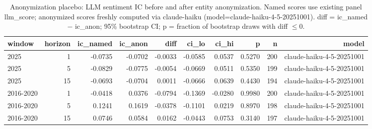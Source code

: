 \begin{table}[htbp]
\centering
\caption{Anonymization placebo: LLM sentiment IC before and after entity anonymization. Named scores use existing panel llm\_score; anonymized scores freshly computed via claude-haiku (model=claude-haiku-4-5-20251001). diff = ic\_named $-$ ic\_anon; 95\% bootstrap CI; p = fraction of bootstrap draws with diff $\leq 0$.}
\label{tab:placebo}
\begin{tabular}{lrrrrrrrrr}
\toprule
window & horizon & ic\_named & ic\_anon & diff & ci\_lo & ci\_hi & p & n & model \\
\midrule
2025 & 1 & -0.0735 & -0.0702 & -0.0033 & -0.0585 & 0.0537 & 0.5270 & 200 & claude-haiku-4-5-20251001 \\
2025 & 5 & -0.0829 & -0.0775 & -0.0054 & -0.0669 & 0.0511 & 0.5350 & 199 & claude-haiku-4-5-20251001 \\
2025 & 15 & -0.0693 & -0.0704 & 0.0011 & -0.0666 & 0.0639 & 0.4430 & 194 & claude-haiku-4-5-20251001 \\
2016-2020 & 1 & -0.0418 & 0.0376 & -0.0794 & -0.1369 & -0.0280 & 0.9980 & 200 & claude-haiku-4-5-20251001 \\
2016-2020 & 5 & 0.1241 & 0.1619 & -0.0378 & -0.1101 & 0.0219 & 0.8970 & 198 & claude-haiku-4-5-20251001 \\
2016-2020 & 15 & 0.0746 & 0.0584 & 0.0162 & -0.0443 & 0.0753 & 0.3140 & 197 & claude-haiku-4-5-20251001 \\
\bottomrule
\end{tabular}
\end{table}
